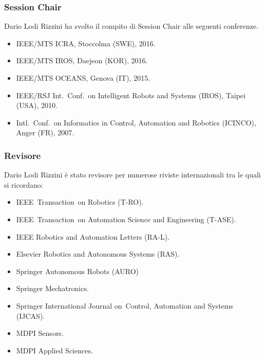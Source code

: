 \documentclass[11pt]{article}
\begin{document}
\subsubsection*{Session Chair}

Dario Lodi Rizzini ha svolto il compito di Session Chair alle seguenti conferenze.
\begin{itemize}
\item IEEE/MTS ICRA, Stoccolma (SWE), 2016. 
\item IEEE/MTS IROS, Daejeon (KOR), 2016. 
\item IEEE/MTS OCEANS, Genova (IT), 2015. 
\item IEEE/RSJ Int.~Conf.~on Intelligent Robots and Systems (IROS), Taipei (USA), 2010.
\item Intl.~Conf.~on Informatics in Control, Automation and Robotics (ICINCO), Anger (FR), 2007.
\end{itemize}


\subsubsection*{Revisore}

Dario Lodi Rizzini \`e stato revisore per numerose riviste internazionali tra le quali si ricordano:
\begin{itemize}
\item IEEE~Transaction~on Robotics (T-RO).
\item IEEE~Transaction~on Automation Science and Engineering (T-ASE).
\item IEEE Robotics and Automation Letters (RA-L). 
\item Elsevier Robotics and Autonomous Systems (RAS).
\item Springer Autonomous Robots (AURO)
\item Springer Mechatronics.
\item Springer International Journal on~Control, Automation and Systems (IJCAS).
\item MDPI Sensors. 
\item MDPI Applied Sciences. 
\end{itemize}
\end{document}
